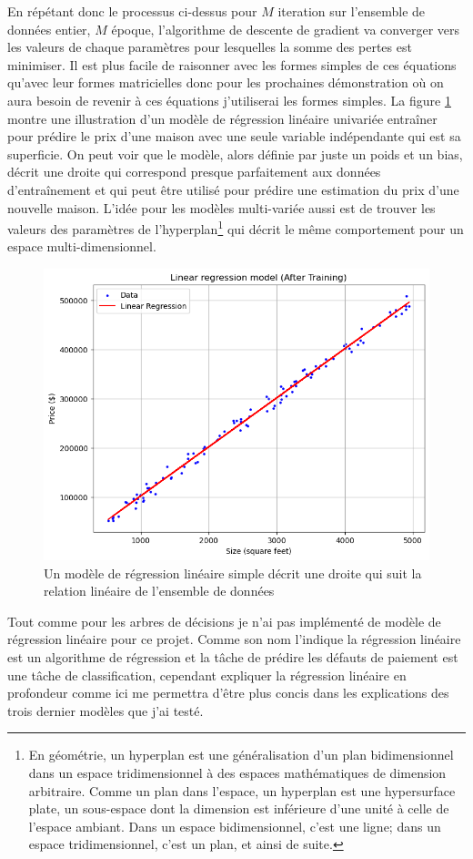 En répétant donc le processus ci-dessus pour \(M\) iteration sur l'ensemble de données entier, \(M\) époque, l'algorithme de descente de gradient va converger vers les valeurs de chaque paramètres pour lesquelles la somme des pertes est minimiser. Il est plus facile de raisonner avec les formes simples de ces équations qu'avec leur formes matricielles donc pour les prochaines démonstration où on aura besoin de revenir à ces équations j'utiliserai les formes simples. La figure \ref{fig:fig7} montre une illustration d'un modèle de régression linéaire univariée entraîner pour prédire le prix d'une maison avec une seule variable indépendante qui est sa superficie. On peut voir que le modèle, alors définie par juste un poids et un bias, décrit une droite qui correspond presque parfaitement aux données d'entraînement et qui peut être utilisé pour prédire une estimation du prix d'une nouvelle maison. L'idée pour les modèles multi-variée aussi est de trouver les valeurs des paramètres de l'hyperplan\footnote{En géométrie, un hyperplan est une généralisation d'un plan bidimensionnel dans un espace tridimensionnel à des espaces mathématiques de dimension arbitraire. Comme un plan dans l'espace, un hyperplan est une hypersurface plate, un sous-espace dont la dimension est inférieure d'une unité à celle de l'espace ambiant. Dans un espace bidimensionnel, c'est une ligne; dans un espace tridimensionnel, c'est un plan, et ainsi de suite.} qui décrit le même comportement pour un espace multi-dimensionnel.

\begin{figure}
    \centering
    \includegraphics[width=0.75\linewidth]{images/linreg.png}
    \caption{Un modèle de régression linéaire simple décrit une droite qui suit la relation linéaire de l'ensemble de données}
    \label{fig:fig7}
\end{figure}

Tout comme pour les arbres de décisions je n'ai pas implémenté de modèle de régression linéaire pour ce projet. Comme son nom l'indique la régression linéaire est un algorithme de régression et la tâche de prédire les défauts de paiement est une tâche de classification, cependant expliquer la régression linéaire en profondeur comme ici me permettra d'être plus concis dans les explications des trois dernier modèles que j'ai testé.
